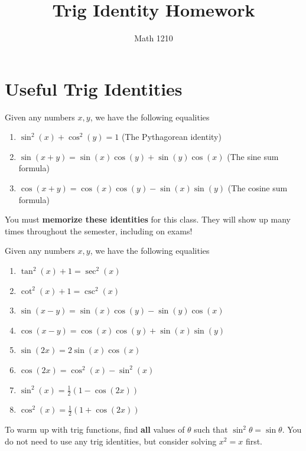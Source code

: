 \documentclass[12pt, a4paper]{article}
\author{Math 1210}
\title{Trig Identity Homework}
\date{}
\begin{document}
\maketitle
\nameline
\section{Useful Trig Identities}
\begin{thrm}
  Given any numbers \(x,y\), we have the following equalities
  \begin{enumerate}
  \item \(\sin^2 (x) + \cos^2 (y) = 1 \) \hspace{2.4in} \text(The Pythagorean identity)
  \item \(\sin(x+y) = \sin(x)\cos(y) + \sin(y)\cos(x)\) \hspace{1in}  (The sine
    sum formula)
  \item \(\cos(x+y) = \cos(x)\cos(y) - \sin(x)\sin(y)\)  \hspace{1in} (The cosine
    sum formula)
  \end{enumerate}
\end{thrm}
\vspace{-0.75in}
You must \textbf{memorize these identities} for this class. They will
show up many times throughout the semester, including on exams!
\begin{thrm}
  Given any numbers \(x,y\), we have the following equalities
  \begin{enumerate}
  \item \(\tan^2(x)+1 = \sec^2(x)\)
  \item \(\cot^2(x)+1 = \csc^2(x)\)
  \item \(\sin(x-y) = \sin(x)\cos(y)-\sin(y)\cos(x)\)
  \item \(\cos(x-y) = \cos(x)\cos(y)+\sin(x)\sin(y)\)
  \item \(\sin(2x) = 2\sin(x)\cos(x)\)
  \item \(\cos(2x) = \cos^2(x)-\sin^2(x)\)
  \item \(\sin^2(x) = \frac{1}{2}(1-\cos(2x))\)
  \item \(\cos^2(x) = \frac{1}{2}(1+\cos(2x))\)
  \end{enumerate}
\end{thrm}
\vspace{-1in}
\begin{ex}
  To warm up with trig functions, find \textbf{all} values of \(\theta\) such that \(\sin^2 \theta
  = \sin \theta\). You do not need to use any trig identities, but
  consider solving \(x^2=x\) first.
\end{ex}
\pagebreak
\end{document}
